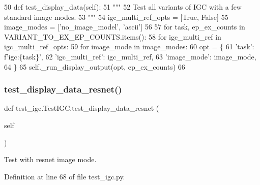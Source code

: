 \begin{DoxyCode}
50     \textcolor{keyword}{def }test\_display\_data(self):
51         \textcolor{stringliteral}{"""}
52 \textcolor{stringliteral}{        Test all variants of IGC with a few standard image modes.}
53 \textcolor{stringliteral}{        """}
54         igc\_multi\_ref\_opts = [\textcolor{keyword}{True}, \textcolor{keyword}{False}]
55         image\_modes = [\textcolor{stringliteral}{'no\_image\_model'}, \textcolor{stringliteral}{'ascii'}]
56 
57         \textcolor{keywordflow}{for} task, ep\_ex\_counts \textcolor{keywordflow}{in} VARIANT\_TO\_EX\_EP\_COUNTS.items():
58             \textcolor{keywordflow}{for} igc\_multi\_ref \textcolor{keywordflow}{in} igc\_multi\_ref\_opts:
59                 \textcolor{keywordflow}{for} image\_mode \textcolor{keywordflow}{in} image\_modes:
60                     opt = \{
61                         \textcolor{stringliteral}{'task'}: f\textcolor{stringliteral}{'igc:\{task\}'},
62                         \textcolor{stringliteral}{'igc\_multi\_ref'}: igc\_multi\_ref,
63                         \textcolor{stringliteral}{'image\_mode'}: image\_mode,
64                     \}
65                     self.\_run\_display\_output(opt, ep\_ex\_counts)
66 
\end{DoxyCode}
\mbox{\label{classtest__igc_1_1TestIGC_a2637e70c3cf17a0304a0d10cebf76937}} 
\subsubsection{\texorpdfstring{test\+\_\+display\+\_\+data\+\_\+resnet()}{test\_display\_data\_resnet()}}
{\footnotesize\ttfamily def test\+\_\+igc.\+Test\+I\+G\+C.\+test\+\_\+display\+\_\+data\+\_\+resnet (\begin{DoxyParamCaption}\item[{}]{self }\end{DoxyParamCaption})}

\begin{DoxyVerb}Test with resnet image mode.
\end{DoxyVerb}
 

Definition at line 68 of file test\+\_\+igc.\+py.


